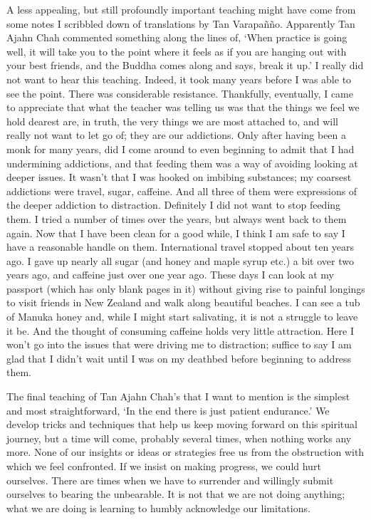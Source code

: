A less appealing, but still profoundly important teaching might have
come from some notes I scribbled down of translations by Tan Varapañño.
Apparently Tan Ajahn Chah commented something along the lines of, `When
practice is going well, it will take you to the point where it feels as
if you are hanging out with your best friends, and the Buddha comes
along and says, break it up.' I really did not want to hear this
teaching. Indeed, it took many years before I was able to see the point.
There was considerable resistance. Thankfully, eventually, I came to
appreciate that what the teacher was telling us was that the things we
feel we hold dearest are, in truth, the very things we are most attached
to, and will really not want to let go of; they are our addictions. Only
after having been a monk for many years, did I come around to even
beginning to admit that I had undermining addictions, and that feeding
them was a way of avoiding looking at deeper issues. It wasn't that I
was hooked on imbibing substances; my coarsest addictions were travel,
sugar, caffeine. And all three of them were expressions of the deeper
addiction to distraction. Definitely I did not want to stop feeding
them. I tried a number of times over the years, but always went back to
them again. Now that I have been clean for a good while, I think I am
safe to say I have a reasonable handle on them. International travel
stopped about ten years ago. I gave up nearly all sugar (and honey and
maple syrup etc.) a bit over two years ago, and caffeine just over one
year ago. These days I can look at my passport (which has only blank
pages in it) without giving rise to painful longings to visit friends in
New Zealand and walk along beautiful beaches. I can see a tub of Manuka
honey and, while I might start salivating, it is not a struggle to leave
it be. And the thought of consuming caffeine holds very little
attraction. Here I won't go into the issues that were driving me to
distraction; suffice to say I am glad that I didn't wait until I was on
my deathbed before beginning to address them.

The final teaching of Tan Ajahn Chah's that I want to mention is the
simplest and most straightforward, `In the end there is just patient
endurance.' We develop tricks and techniques that help us keep moving
forward on this spiritual journey, but a time will come, probably
several times, when nothing works any more. None of our insights or
ideas or strategies free us from the obstruction with which we feel
confronted. If we insist on making progress, we could hurt ourselves.
There are times when we have to surrender and willingly submit ourselves
to bearing the unbearable. It is not that we are not doing anything;
what we are doing is learning to humbly acknowledge our limitations.

